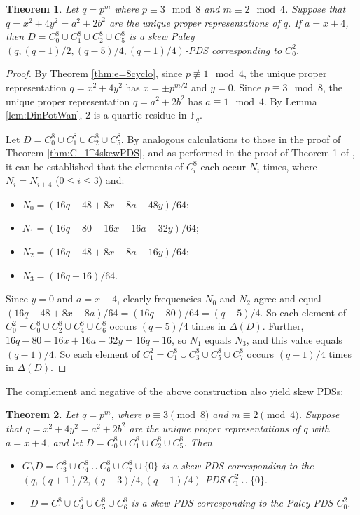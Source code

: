 \documentclass[12pt, a4paper]{article}
\newtheorem{theorem}{Theorem}[section]
\theoremstyle{definition}
\begin{document}
\begin{theorem}\label{thm:e=8skewPaley}
Let $q=p^m$ where $p \equiv 3 \mod 8$ and $m \equiv 2 \mod 4$.
Suppose that $q=x^2+4y^2=a^2+2b^2$
are the unique proper representations of $q$.
If $a=x+4$, then $D=C_0^8 \cup C_1^8 \cup C_2^8 \cup C_5^8$ is a skew Paley $(q,(q-1)/2,(q-5)/4,(q-1)/4)$-PDS corresponding to $C_0^2$.
\end{theorem}
\begin{proof}
By Theorem \ref{thm:e=8cyclo}, since $p \not\equiv 1 \mod 4$, the unique proper representation $q=x^2+4y^2$ has $x=\pm p^{m/2}$ and $y=0$.  Since $p \equiv 3 \mod 8$, the unique proper representation $q=a^2+2b^2$ has $a \equiv 1 \mod 4$.  By Lemma \ref{lem:DinPotWan}, $2$ is a quartic residue in $\mathbb{F}_q$.

Let $D=C_0^8 \cup C_1^8 \cup C_2^8 \cup C_5^8$.  By analogous calculations to those in the proof of Theorem \ref{thm:C_1^4skewPDS}, and as performed in the proof of Theorem 1 of \cite{DinPotWan}, it can be established that the elements of $C_i^8$ each occur $N_i$  times, where $N_i=N_{i+4}$ ($0 \leq i \leq 3$) and:
\begin{itemize}
\item $N_0=(16q-48+8x-8a-48y)/64$;
\item $N_1=(16q-80-16x+16a-32y)/64$;
\item $N_2=(16q-48+8x-8a-16y)/64$;
\item $N_3=(16q-16)/64$.
\end{itemize}
Since $y=0$ and $a=x+4$, clearly frequencies $N_0$ and $N_2$ agree and equal $(16q-48+8x-8a)/64=(16q-80)/64=(q-5)/4$. So each element of $C_0^2=C_0^8 \cup C_2^8 \cup C_4^8 \cup C_6^8$ occurs $(q-5)/4$ times in $\Delta(D)$. Further,  $16q-80-16x+16a-32y=16q-16$, so $N_1$ equals $N_3$, and this value equals $(q-1)/4$.  So each element of $C_1^2=C_1^8 \cup C_3^8 \cup C_5^8 \cup C_7^8$ occurs $(q-1)/4$ times in $\Delta(D)$.
\end{proof}



The complement and negative of the above construction also yield skew PDSs:
\begin{theorem}
Let \(q=p^m\), where \(p\equiv 3 \pmod 8\) and \(m\equiv 2 \pmod 4\). Suppose that $q=x^2+4y^2=a^2+2b^2$ are the unique proper representations of \(q\) with \(a=x+4\), and let
$D=C_0^8\cup C_1^8\cup C_2^8\cup C_5^8$. 
	Then 
	\begin{itemize}
		\item[i)]
		$
		G\setminus D
		=
		C_3^8\cup C_4^8\cup C_6^8\cup C_7^8\cup\{0\}
		$
		is a skew PDS corresponding to the
	$	
		(q,(q+1)/2,(q+3)/4,(q-1)/4)$-PDS 
$ 		C_1^2\cup\{0\}.
		$
		\item[ii)]
		$
		-D=C_1^8\cup C_4^8\cup C_5^8\cup C_6^8
		$ 
		is a skew PDS corresponding to the Paley PDS \(C_0^2\).
	\end{itemize}
\end{theorem}
\end{document}

